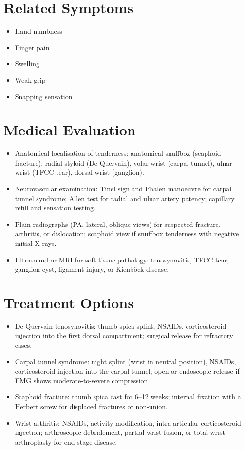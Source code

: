 \section*{Related Symptoms}
\begin{itemize}
  \item Hand numbness
  \item Finger pain
  \item Swelling
  \item Weak grip
  \item Snapping sensation
\end{itemize}

\section*{Medical Evaluation}
\begin{itemize}
  \item Anatomical localisation of tenderness: anatomical snuffbox (scaphoid fracture), radial styloid (De Quervain), volar wrist (carpal tunnel), ulnar wrist (TFCC tear), dorsal wrist (ganglion).
  \item Neurovascular examination: Tinel sign and Phalen manoeuvre for carpal tunnel syndrome; Allen test for radial and ulnar artery patency; capillary refill and sensation testing.
  \item Plain radiographs (PA, lateral, oblique views) for suspected fracture, arthritis, or dislocation; scaphoid view if snuffbox tenderness with negative initial X-rays.
  \item Ultrasound or MRI for soft tissue pathology: tenosynovitis, TFCC tear, ganglion cyst, ligament injury, or Kienböck disease.
\end{itemize}

\section*{Treatment Options}
\begin{itemize}
  \item De Quervain tenosynovitis: thumb spica splint, NSAIDs, corticosteroid injection into the first dorsal compartment; surgical release for refractory cases.
  \item Carpal tunnel syndrome: night splint (wrist in neutral position), NSAIDs, corticosteroid injection into the carpal tunnel; open or endoscopic release if EMG shows moderate-to-severe compression.
  \item Scaphoid fracture: thumb spica cast for 6--12 weeks; internal fixation with a Herbert screw for displaced fractures or non-union.
  \item Wrist arthritis: NSAIDs, activity modification, intra-articular corticosteroid injection; arthroscopic debridement, partial wrist fusion, or total wrist arthroplasty for end-stage disease.
\end{itemize}

